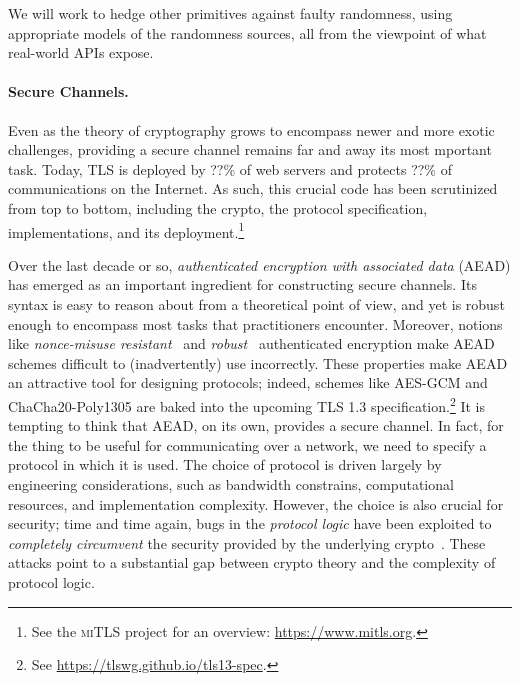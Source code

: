 \begin{task}
We will work to hedge other primitives against faulty randomness,
using appropriate models of the randomness sources, all from the
viewpoint of what real-world APIs expose.
\end{task}


\paragraph{Secure Channels. }
Even as the theory of cryptography grows to encompass newer and more exotic
challenges, providing a secure channel remains far and away its most mportant
task.
%
Today, TLS is deployed by ??\% of web servers and protects ??\% of
communications on the Internet.
%
%
As such, this crucial code has been scrutinized
from top to bottom, including the crypto, the protocol specification,
implementations, and its deployment.\footnote{ See the \textsc{miTLS} project
for an overview: \url{https://www.mitls.org}.}
%

Over the last decade or so, \emph{authenticated encryption with associated data}
(AEAD) has emerged as an important ingredient for constructing secure channels.
%
Its syntax is easy to reason about from a theoretical point of view, and yet is
robust enough to encompass most tasks that practitioners encounter. Moreover,
notions like \emph{nonce-misuse resistant}~\cite{RS07} and
\emph{robust}~\cite{HKR14} authenticated encryption make AEAD schemes difficult
to (inadvertently) use incorrectly. These properties make AEAD an attractive
tool for designing protocols; indeed, schemes like AES-GCM and
ChaCha20\mbox{-}Poly1305 are baked into the upcoming TLS 1.3
specification.\footnote{ See \url{https://tlswg.github.io/tls13-spec}.}
%
It is tempting to think that AEAD, on its own, provides a secure channel. In
fact, for the thing to be useful for communicating over a network, we need to
specify a protocol in which it is used. The choice of protocol is driven largely
by engineering considerations, such as bandwidth constrains, computational
resources, and implementation complexity. However, the choice is also crucial
for security; time and time again, bugs in the \emph{protocol logic} have been
exploited to \emph{completely circumvent} the security provided by the
underlying crypto~\cite{BKN02}. These attacks point to a substantial gap between
crypto theory and the complexity of protocol logic.

